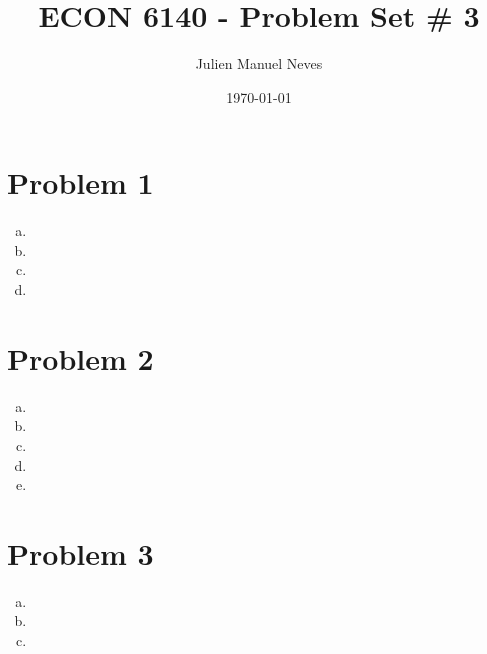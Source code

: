 \documentclass[12pt]{article}
\title{ECON 6140 - Problem Set \# 3}
\date{\today}
\author{Julien Manuel Neves}
\newcommand{\1}{{\bf 1}} %
\begin{document}
\maketitle

\section*{Problem 1}
\begin{enumerate}[(a)]
	\item
	\item
	\item
	\item
\end{enumerate}

\section*{Problem 2}
\begin{enumerate}[(a)]
	\item
	\item
	\item
	\item
	\item
\end{enumerate}

\section*{Problem 3}
\begin{enumerate}[(a)]
	\item
	\item
	\item
\end{enumerate}
\end{document}
